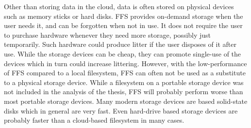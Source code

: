 Other than storing data in the cloud, data is often stored on physical devices such as memory sticks or hard disks. \gls{FFS} provides \mbox{on-demand} storage when the user needs it, and can be forgotten when not in use. It does not require the user to purchase hardware whenever they need more storage, possibly just temporarily. Such hardware could produce litter if the user disposes of it after use. While the storage devices can be cheap, they can promote \mbox{single-use} of the devices which in turn could increase littering. However, with the low-performance of \gls{FFS} compared to a local filesystem, \gls{FFS} can often not be used as a substitute to a physical storage device. While a filesystem on a portable storage device was not included in the analysis of the thesis, \gls{FFS} will probably perform worse than most portable storage devices. Many modern storage devices are based solid-state disks which in general are very fast. Even hard-drive based storage devices are probably faster than a \mbox{cloud-based} filesystem in many cases.

